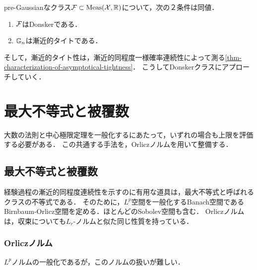 \documentclass[uplatex,dvipdfmx]{jsreport}
\begin{document}
\begin{lemma}
    pre-Gaussianなクラス$\mathcal{F}\subset\mathrm{Meas}(\mathcal{X},\mathbb{R})$について，次の２条件は同値．
    \begin{enumerate}
        \item $\mathcal{F}$はDonskerである．
        \item $\mathbb{G}_n$は漸近的タイトである．
    \end{enumerate}
\end{lemma}
\begin{remarks}
    そして，漸近的タイト性は，漸近的同程度一様確率連続性によって測る\ref{thm-characterization-of-asymptotical-tightness}．
    こうしてDonskerクラスにアプローチしていく．
\end{remarks}

\section{最大不等式と被覆数}

\begin{tcolorbox}[colframe=ForestGreen, colback=ForestGreen!10!white,breakable,colbacktitle=ForestGreen!40!white,coltitle=black,fonttitle=\bfseries\sffamily,
title=]
    大数の法則と中心極限定理を一般化するにあたって，いずれの場合も上限を評価する必要がある．
    この共通する手法を，Orliczノルムを用いて整備する．
\end{tcolorbox}

\subsection{最大不等式と被覆数}

\begin{tcolorbox}[colframe=ForestGreen, colback=ForestGreen!10!white,breakable,colbacktitle=ForestGreen!40!white,coltitle=black,fonttitle=\bfseries\sffamily,
title=]
    経験過程の漸近的同程度連続性を示すのに有用な道具は，最大不等式と呼ばれるクラスの不等式である．
    そのために，$L^p$空間を一般化するBanach空間であるBirnbaum-Orlicz空間を定める．ほとんどのSobolev空間も含む．
    Orliczノルムは，収束についても$L_r$-ノルムと似た同じ性質を持っている．
\end{tcolorbox}

\subsubsection{Orliczノルム}

\begin{tcolorbox}[colframe=ForestGreen, colback=ForestGreen!10!white,breakable,colbacktitle=ForestGreen!40!white,coltitle=black,fonttitle=\bfseries\sffamily,
title=]
    $L^p$ノルムの一般化であるが，このノルムの扱いが難しい．
\end{tcolorbox}
\end{document}
